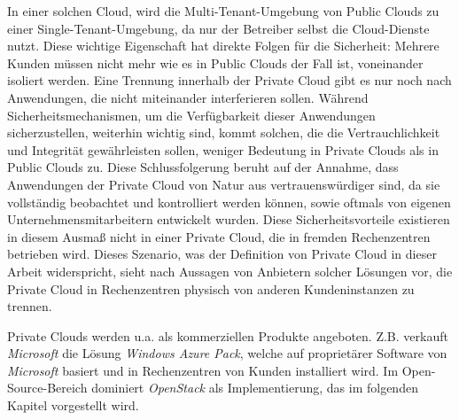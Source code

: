 \documentclass[../main.tex]{subfiles}
\begin{document}
    In einer solchen Cloud, wird die Multi-Tenant-Umgebung von Public Clouds zu einer Single-Tenant-Umgebung, da nur der Betreiber selbst die Cloud-Dienste nutzt. Diese wichtige Eigenschaft hat direkte Folgen für die Sicherheit:
    Mehrere Kunden müssen nicht mehr wie es in Public Clouds der Fall ist, voneinander isoliert werden. Eine Trennung innerhalb der Private Cloud gibt es nur noch nach Anwendungen, die nicht miteinander interferieren sollen. Während Sicherheitsmechanismen, um die Verfügbarkeit dieser Anwendungen sicherzustellen, weiterhin wichtig sind, kommt solchen, die die Vertrauchlichkeit und Integrität gewährleisten sollen, weniger Bedeutung in Private Clouds als in Public Clouds zu. Diese Schlussfolgerung beruht auf der Annahme, dass Anwendungen der Private Cloud von Natur aus vertrauenswürdiger sind, da sie vollständig beobachtet und kontrolliert werden können, sowie oftmals von eigenen Unternehmensmitarbeitern entwickelt wurden.
    Diese Sicherheitsvorteile existieren in diesem Ausmaß nicht in einer Private Cloud, die in fremden Rechenzentren betrieben wird. Dieses Szenario, was der Definition von Private Cloud in dieser Arbeit widerspricht, sieht nach Aussagen von Anbietern solcher Lösungen vor, die Private Cloud in Rechenzentren physisch von anderen Kundeninstanzen zu trennen.


    Private Clouds werden u.a. als kommerziellen Produkte angeboten. Z.B. verkauft \emph{Microsoft} die Lösung \emph{Windows Azure Pack}, welche auf proprietärer Software von \emph{Microsoft} basiert und in Rechenzentren von Kunden installiert wird. Im Open-Source-Bereich dominiert \emph{OpenStack} als Implementierung, das im folgenden Kapitel vorgestellt wird.
\end{document}
